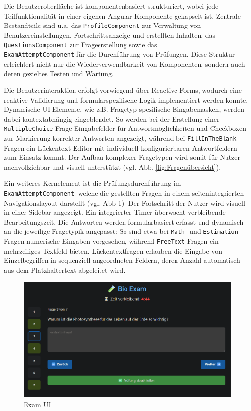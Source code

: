 \documentclass[a4paper,12pt]{article}
\begin{document}
Die Benutzeroberfläche ist komponentenbasiert strukturiert, wobei jede Teilfunktionalität in einer eigenen Angular-Komponente gekapselt ist. Zentrale Bestandteile sind u.a. das 	\texttt{ProfileComponent} zur Verwaltung von Benutzereinstellungen, Fortschrittsanzeige und erstellten Inhalten, das \texttt{QuestionsComponent} zur Frageerstellung sowie das \\	\texttt{ExamAttemptComponent} für die Durchführung von Prüfungen. Diese Struktur erleichtert nicht nur die Wiederverwendbarkeit von Komponenten, sondern auch deren gezieltes Testen und Wartung.

Die Benutzerinteraktion erfolgt vorwiegend über Reactive Forms, wodurch eine reaktive Validierung und formularspezifische Logik implementiert werden konnte. Dynamische UI-Elemente, wie z.B. Fragetyp-spezifische Eingabemasken, werden dabei kontextabhängig eingeblendet. So werden bei der Erstellung einer 	\texttt{MultipleChoice}-Frage Eingabefelder für Antwortmöglichkeiten und Checkboxen zur Markierung korrekter Antworten angezeigt, während bei 	\texttt{FillInTheBlank}-Fragen ein Lückentext-Editor mit individuell konfigurierbaren Antwortfeldern zum Einsatz kommt. Der Aufbau komplexer Fragetypen wird somit für Nutzer nachvollziehbar und visuell unterstützt (vgl. Abb. \ref{fig:Fragenübersicht}).

Ein weiteres Kernelement ist die Prüfungsdurchführung im 	\texttt{ExamAttemptComponent}, welche die gestellten Fragen in einem seitenintegrierten Navigationslayout darstellt (vgl. Abb \ref{fig:exam}). Der Fortschritt der Nutzer wird visuell in einer Sidebar angezeigt. Ein integrierter Timer überwacht verbleibende Bearbeitungszeit. Die Antworten werden formularbasiert erfasst und dynamisch an die jeweilige Fragetypik angepasst: So sind etwa bei 	\texttt{Math}- und 	\texttt{Estimation}-Fragen numerische Eingaben vorgesehen, während 	\texttt{FreeText}-Fragen ein mehrzeiliges Textfeld bieten. Lückentextfragen erlauben die Eingabe von Einzelbegriffen in sequenziell angeordneten Feldern, deren Anzahl automatisch aus dem Platzhaltertext abgeleitet wird.

\begin{figure}[H]
    \centering
    \includegraphics[width=1\textwidth]{Bilder/Exam.png}
    \caption{Exam UI}
    \label{fig:exam}
\end{figure}
\end{document}
